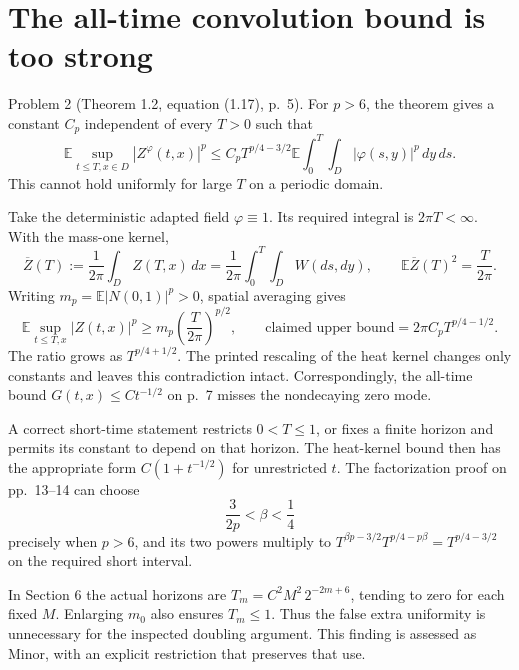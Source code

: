 \documentclass[10pt]{article}
\begin{document}
\section*{The all-time convolution bound is too strong}
Problem 2 (Theorem 1.2, equation (1.17), p. 5).  For \(p>6\), the theorem gives a constant \(C_p\) independent of every \(T>0\) such that \[\mathbb E\sup_{t\le T,x\in D}|Z^\varphi(t,x)|^p
 \le C_pT^{p/4-3/2}
       \mathbb E\int_0^T\int_D|\varphi(s,y)|^p\,dy\,ds .\] This cannot hold uniformly for large \(T\) on a periodic domain.\par
Take the deterministic adapted field \(\varphi\equiv1\). Its required integral is \(2\pi T<\infty\). With the mass-one kernel, \[\overline Z(T):=\frac1{2\pi}\int_D Z(T,x)\,dx
       =\frac1{2\pi}\int_0^T\int_D W(ds,dy),
 \qquad \mathbb E\overline Z(T)^2=\frac{T}{2\pi}.\] Writing \(m_p=\mathbb E|N(0,1)|^p>0\), spatial averaging gives \[\mathbb E\sup_{t\le T,x}|Z(t,x)|^p
 \ge m_p\left(\frac{T}{2\pi}\right)^{p/2},
 \qquad
 \text{claimed upper bound}=2\pi C_pT^{p/4-1/2}.\] The ratio grows as \(T^{p/4+1/2}\). The printed rescaling of the heat kernel changes only constants and leaves this contradiction intact. Correspondingly, the all-time bound \(G(t,x)\le Ct^{-1/2}\) on p. 7 misses the nondecaying zero mode.\par
A correct short-time statement restricts \(0<T\le1\), or fixes a finite horizon and permits its constant to depend on that horizon. The heat-kernel bound then has the appropriate form \(C(1+t^{-1/2})\) for unrestricted \(t\). The factorization proof on pp. 13–14 can choose \[\frac{3}{2p}<\beta<\frac14\] precisely when \(p>6\), and its two powers multiply to \(T^{\beta p-3/2}T^{p/4-p\beta}=T^{p/4-3/2}\) on the required short interval.\par
In Section 6 the actual horizons are \(T_m=C^2M^2\,2^{-2m+6}\), tending to zero for each fixed \(M\). Enlarging \(m_0\) also ensures \(T_m\le1\). Thus the false extra uniformity is unnecessary for the inspected doubling argument. This finding is assessed as Minor, with an explicit restriction that preserves that use.\par
\end{document}

